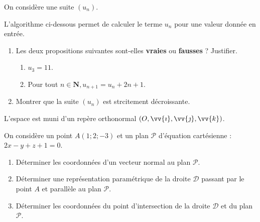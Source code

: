 \begin{question}[topic=suites]
  On considère une suite $(u_n)$.

  L'algorithme ci-dessous permet de calculer le terme $u_n$ pour une valeur
  donnée en entrée.

  \begin{center}
  \end{center}
  \begin{enumerate}
    \item Les deux propositions suivantes sont-elles \textbf{vraies} ou
      \textbf{fausses} ? Justifier.
      \begin{enumerate}
        \item $u_3 = 11$.
        \item Pour tout $n \in \mathbf{N}, u_{n+1} = u_n + 2n + 1.$
      \end{enumerate}
    \item Montrer que la suite $(u_n)$ est strcitement décroissante.
  \end{enumerate}
\end{question}

\begin{question}[topic=espace]
  L'espace est muni d'un repère orthonormal $(O,\vv{\imath}, \vv{\jmath},
  \vv{k})$.

  On considère un point $A(1;2;-3)$ et un plan $\mathcal{P}$ d'équation
  cartésienne : $2x - y + z + 1 = 0$.
  \begin{enumerate}
    \item Déterminer les coordonnées d'un vecteur normal au plan
      $\mathcal{P}$.
    \item Déterminer une représentation paramétrique de la droite
      $\mathcal{D}$ passant par le point $A$ et parallèle au plan
      $\mathcal{P}$.
    \item Déterminer les coordonnées du point d'intersection de la droite
      $\mathcal{D}$ et du plan $\mathcal{P}$.
  \end{enumerate}
\end{question}

